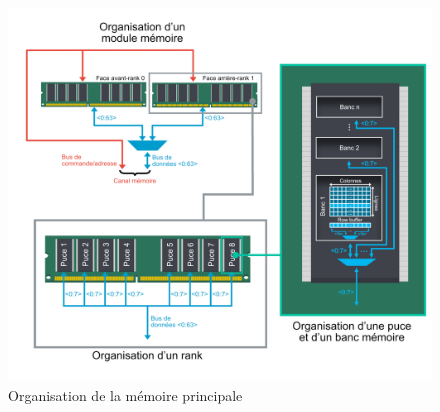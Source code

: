 \begin{figure}
	\centering
	\includegraphics[width=\linewidth]{graphics/figures/orga-dram.pdf}
	\caption{\label{fig:dram_organization}Organisation de la mémoire principale}
\end{figure}
	
		

